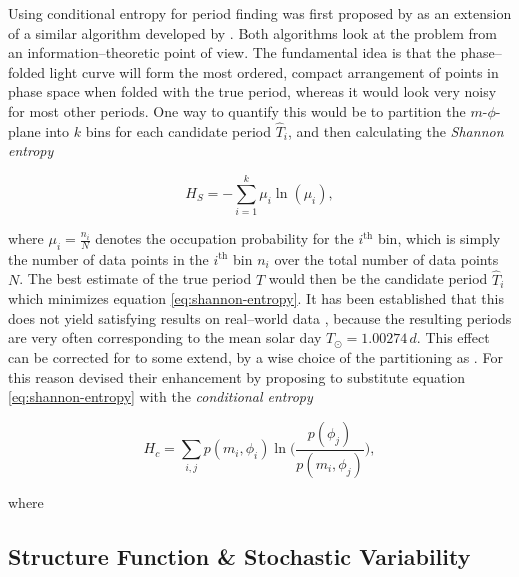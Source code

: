 Using conditional entropy for period finding was first proposed by \citet{graham2013} as an extension of a similar algorithm developed by \citet{cincotta1995}. Both algorithms look at the problem from an information--theoretic point of view. The fundamental idea is that the phase--folded light curve will form the most ordered, compact arrangement of points in phase space when folded with the true period, whereas it would look very noisy for most other periods. One way to quantify this would be to partition the $m$-$\phi$-plane into $k$ bins for each candidate period $\hat T_i$, and then calculating the \emph{Shannon entropy}


\begin{equation}
\label{eq:shannon-entropy}
H_S = - \sum_{i=1}^k \mu_i \ln(\mu_i),
\end{equation}

where $\mu_i = \frac{n_i}{N}$ denotes the occupation probability for the $i^\text{th}$ bin, which is simply the number of data points in the $i^\text{th}$ bin $n_i$ over the total number of data points $N$. The best estimate of the true period $T$ would then be the candidate period $\hat T_i$ which minimizes equation \eqref{eq:shannon-entropy}. It has been established that this does not yield satisfying results on real--world data \citep{cincotta1999}, because the resulting periods are very often corresponding to the mean solar day $T_\odot = 1.00274 \, \unit{d}$. This effect can be corrected for to some extend, \eg by a wise choice of the partitioning as \citet{cincotta1999,drake2013}. For this reason \citeauthor{graham2013} devised their enhancement by proposing to substitute equation \eqref{eq:shannon-entropy} with the \emph{conditional entropy}

\begin{equation}
H_c = \sum_{i,j} p(m_i, \phi_i) \ln\big(\frac{p(\phi_j)}{p(m_i, \phi_j)}\big),
\end{equation}

where 




\subsection{Structure Function \& Stochastic Variability}
\label{subsec:structure-function}

